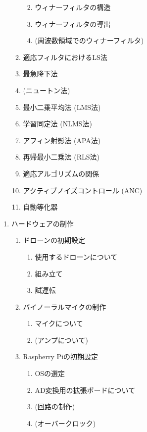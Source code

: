 \documentclass[
  9pt
]{jsarticle}
\providecommand{\tightlist}{%
  \setlength{\itemsep}{0pt}\setlength{\parskip}{0pt}}
\begin{document}
\begin{enumerate}
\begin{enumerate}
    \begin{enumerate}
    \def\labelenumiii{\arabic{enumiii}.}
    \tightlist
    \item
      ウィナーフィルタの構造
    \item
      ウィナーフィルタの導出
    \item
      (周波数領域でのウィナーフィルタ)
    \end{enumerate}
  \item
    適応フィルタにおけるLS法
  \item
    最急降下法
  \item
    (ニュートン法)
  \item
    最小二乗平均法 (LMS法)
  \item
    学習同定法 (NLMS法)
  \item
    アフィン射影法 (APA法)
  \item
    再帰最小二乗法 (RLS法)
  \item
    適応アルゴリズムの関係
  \item
    アクティブノイズコントロール (ANC)
  \item
    自動等化器
  \end{enumerate}
\end{enumerate}

\begin{enumerate}
\def\labelenumi{\arabic{enumi}.}
\setcounter{enumi}{2}
\tightlist
\item
  ハードウェアの制作

  \begin{enumerate}
  \def\labelenumii{\arabic{enumii}.}
  \tightlist
  \item
    ドローンの初期設定

    \begin{enumerate}
    \def\labelenumiii{\arabic{enumiii}.}
    \tightlist
    \item
      使用するドローンについて
    \item
      組み立て
    \item
      試運転
    \end{enumerate}
  \item
    バイノーラルマイクの制作

    \begin{enumerate}
    \def\labelenumiii{\arabic{enumiii}.}
    \tightlist
    \item
      マイクについて
    \item
      (アンプについて)
    \end{enumerate}
  \item
    Raspberry Piの初期設定

    \begin{enumerate}
    \def\labelenumiii{\arabic{enumiii}.}
    \tightlist
    \item
      OSの選定
    \item
      AD変換用の拡張ボードについて
    \item
      (回路の制作)
    \item
      (オーバークロック)
    \end{enumerate}
  \end{enumerate}
\end{enumerate}
\end{document}
